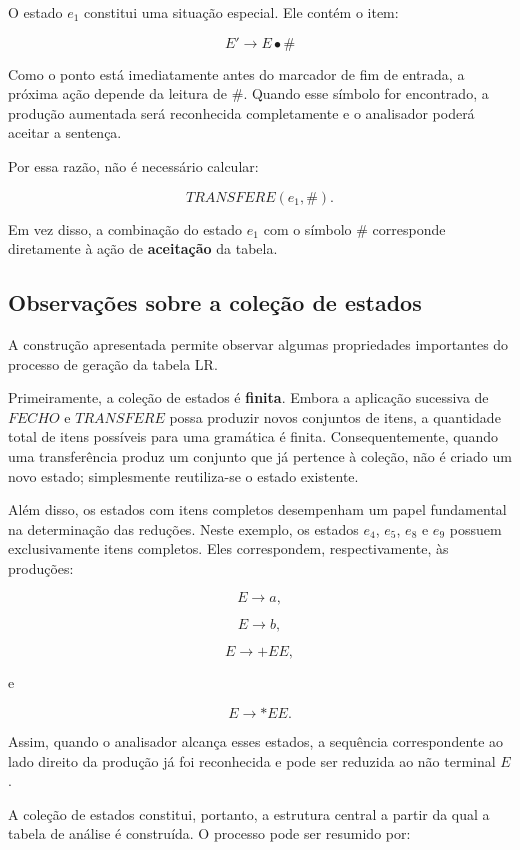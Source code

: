 \documentclass[
  brazilian,
  letterpaper,
]{book}
\theoremstyle{plain}
\theoremstyle{definition}
\theoremstyle{remark}
\begin{document}
O estado \(e_1\) constitui uma situação especial. Ele contém o item:

\[
E'\rightarrow E\bullet\#
\]

Como o ponto está imediatamente antes do marcador de fim de entrada, a
próxima ação depende da leitura de \(\#\). Quando esse símbolo for
encontrado, a produção aumentada será reconhecida completamente e o
analisador poderá aceitar a sentença.

Por essa razão, não é necessário calcular:

\[
TRANSFERE(e_1,\#).
\]

Em vez disso, a combinação do estado \(e_1\) com o símbolo \(\#\)
corresponde diretamente à ação de \textbf{aceitação} da tabela.

\subsection{Observações sobre a coleção de
estados}\label{observauxe7uxf5es-sobre-a-coleuxe7uxe3o-de-estados}

A construção apresentada permite observar algumas propriedades
importantes do processo de geração da tabela LR.

Primeiramente, a coleção de estados é \textbf{finita}. Embora a
aplicação sucessiva de \(FECHO\) e \(TRANSFERE\) possa produzir novos
conjuntos de itens, a quantidade total de itens possíveis para uma
gramática é finita. Consequentemente, quando uma transferência produz um
conjunto que já pertence à coleção, não é criado um novo estado;
simplesmente reutiliza-se o estado existente.

Além disso, os estados com itens completos desempenham um papel
fundamental na determinação das reduções. Neste exemplo, os estados
\(e_4\), \(e_5\), \(e_8\) e \(e_9\) possuem exclusivamente itens
completos. Eles correspondem, respectivamente, às produções:

\[
E\rightarrow a,
\]

\[
E\rightarrow b,
\]

\[
E\rightarrow +EE,
\]

e

\[
E\rightarrow *EE.
\]

Assim, quando o analisador alcança esses estados, a sequência
correspondente ao lado direito da produção já foi reconhecida e pode ser
reduzida ao não terminal \(E\).

A coleção de estados constitui, portanto, a estrutura central a partir
da qual a tabela de análise é construída. O processo pode ser resumido
por:
\end{document}
